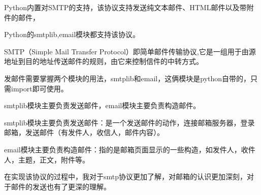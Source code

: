 \documentclass[a4paper,12pt]{report}
\begin{document}
\begin{spacing}{1.5}
Python内置对SMTP的支持，该协议支持发送纯文本邮件、HTML邮件以及带附件的邮件，

Python的smtplib,email模块都支持该协议。

SMTP（Simple Mail Transfer Protocol）即简单邮件传输协议,它是一组用于由源地址到目的地址传送邮件的规则，由它来控制信件的中转方式。

发邮件需要掌握两个模块的用法，smtplib和email，这俩模块是python自带的，只需import即可使用。

smtplib模块主要负责发送邮件，email模块主要负责构造邮件。

smtplib模块主要负责发送邮件：是一个发送邮件的动作，连接邮箱服务器，登录邮箱，发送邮件（有发件人，收信人，邮件内容）。

email模块主要负责构造邮件：指的是邮箱页面显示的一些构造，如发件人，收件人，主题，正文，附件等。

在实现该协议的过程中，我对于smtp协议更加了解，对邮箱的认识更加深刻，对于邮件的发送也有了更深的理解。



\end{spacing}
\end{document}
